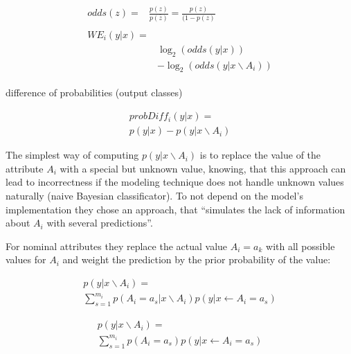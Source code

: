     \par
        \begin{align}
            \begin{split}
                odds(z) ={}& \frac{p(z)}{p(\bar{z})} = \frac{p(z)}{(1 − p(z)}
            \end{split}\\
            \begin{split}
                WE_{i}(y|x) ={}& \\
                & \log_{2} (odds(y|x)) \\
                & - \log_{2}(odds(y|x \backslash A_{i}))    
            \end{split}
        \end{align}
        \par
    difference of probabilities (output classes)
    \par
        \begin{multline}
            probDiff_{i} (y|x) = \\
        p(y|x)− p(y|x \backslash A_{i})
        \end{multline}
        
\par
The simplest way of computing \(p(y|x \backslash A_{i})\) is to replace the value of the attribute \(A_{i}\) with a special but unknown value, knowing, that this approach can lead to incorrectness if the modeling technique does not handle unknown values naturally (naive Bayesian classificator).
To not depend on the model's implementation they chose an approach, that “simulates the lack of information about \(A_{i}\) with several predictions”\cite[p.4]{RobnikSikonja.2008}.
\par
For  nominal attributes they replace the actual value \(A_{i} = a_{k}\) with all possible values for \(A_{i}\) and weight the prediction by the prior probability of the value: 
\par
        \begin{multline} 
            p(y|x \backslash A_{i}) = \\ 
            \sum_{s=1}^{m_{i}} p(A_{i} = a_{s} | x \backslash A_{i})p(y|x \leftarrow A_{i} = a_{s})
        \end{multline}
        \par
    
        \begin{multline}
            p(y|x \backslash A_{i}) = \\ 
            \sum_{s=1}^{m_{i}} p(A_{i} = a_{s})p(y|x \leftarrow A_{i} = a_{s})
        \end{multline}
        \par

